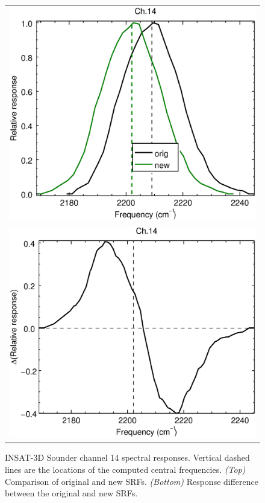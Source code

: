 \begin{figure}[H]
  \centering
  \begin{tabular}{c}
    \includegraphics[scale=0.55]{graphics/sndr/srf/sndr_insat3d-14.eps} \\
    \includegraphics[scale=0.55]{graphics/sndr/srf/sndr_insat3d-14.difference.eps}
  \end{tabular}
  \caption{INSAT-3D Sounder channel 14 spectral responses. Vertical dashed lines are the locations of the computed central frequencies. \emph{(Top)} Comparison of original and new SRFs. \emph{(Bottom)} Response difference between the original and new SRFs.}
  \label{fig:sndr_ch14}
\end{figure}


